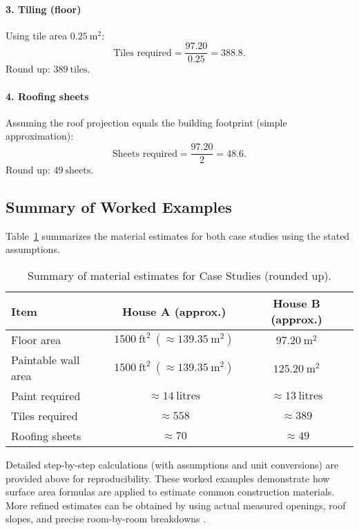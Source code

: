 \documentclass[12pt,a4paper,openany,titlepage,reqno, final]{report}
\theoremstyle{definition}
\begin{document}
	\paragraph{3. Tiling (floor)}
	Using tile area $0.25\ \text{m}^2$:
	\[
	\text{Tiles required} = \frac{97.20}{0.25} = 388.8.
	\]
	Round up: \(\boxed{389\ \text{tiles}}\).
	
	\paragraph{4. Roofing sheets}
	Assuming the roof projection equals the building footprint (simple approximation):
	\[
	\text{Sheets required} = \frac{97.20}{2} = 48.6.
	\]
	Round up: \(\boxed{49\ \text{sheets}}\).
	
	\subsection{Summary of Worked Examples}
	Table~\ref{tab:estimates} summarizes the material estimates for both case studies using the stated assumptions.
	
	\begin{table}[h!]
		\centering
		\begin{tabular}{l c c}
			\hline
			\textbf{Item} & \textbf{House A (approx.)} & \textbf{House B (approx.)} \\
			\hline
			Floor area & $1500\ \text{ft}^2\ (\approx139.35\ \text{m}^2)$ & $97.20\ \text{m}^2$ \\
			Paintable wall area & $1500\ \text{ft}^2\ (\approx139.35\ \text{m}^2)$ & $125.20\ \text{m}^2$ \\
			Paint required & $\approx14\ \text{litres}$ & $\approx13\ \text{litres}$ \\
			Tiles required & $\approx558$ & $\approx389$ \\
			Roofing sheets & $\approx70$ & $\approx49$ \\
			\hline
		\end{tabular}
		\caption{Summary of material estimates for Case Studies (rounded up).}
		\label{tab:estimates}
	\end{table}
	
	Detailed step-by-step calculations (with assumptions and unit conversions) are provided above for reproducibility. These worked examples demonstrate how surface area formulas are applied to estimate common construction materials. More refined estimates can be obtained by using actual measured openings, roof slopes, and precise room-by-room breakdowns \cite{jones2012,akinyemi2018,okonkwo2020,smith2014}.
	
\end{document}
